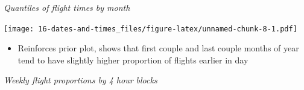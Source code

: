 \documentclass[]{book}
\newenvironment{Shaded}{\begin{snugshade}}{\end{snugshade}}
\newcommand{\DataTypeTok}[1]{\textcolor[rgb]{0.13,0.29,0.53}{#1}}
\newcommand{\KeywordTok}[1]{\textcolor[rgb]{0.13,0.29,0.53}{\textbf{#1}}}
\newcommand{\NormalTok}[1]{#1}
\newcommand{\OperatorTok}[1]{\textcolor[rgb]{0.81,0.36,0.00}{\textbf{#1}}}
\newcommand{\OtherTok}[1]{\textcolor[rgb]{0.56,0.35,0.01}{#1}}
\newcommand{\StringTok}[1]{\textcolor[rgb]{0.31,0.60,0.02}{#1}}
\providecommand{\tightlist}{%
  \setlength{\itemsep}{0pt}\setlength{\parskip}{0pt}}
\theoremstyle{definition}
\theoremstyle{definition}
\theoremstyle{definition}
\theoremstyle{remark}
\begin{document}
\begin{enumerate}
  \emph{Quantiles of flight times by month}

\begin{Shaded}
\end{Shaded}

  \texttt{[image: 16-dates-and-times\_files/figure-latex/unnamed-chunk-8-1.pdf]}

  \begin{itemize}
  \tightlist
  \item
    Reinforces prior plot, shows that first couple and last couple
    months of year tend to have slightly higher proportion of flights
    earlier in day
  \end{itemize}

  \emph{Weekly flight proportions by 4 hour blocks}


\end{enumerate}
\end{document}

